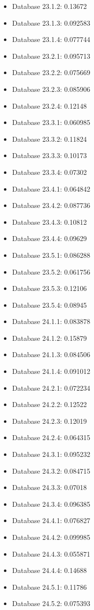 \begin{itemize}
\item Database 23.1.2: 0.13672
\item Database 23.1.3: 0.092583
\item Database 23.1.4: 0.077744
\item Database 23.2.1: 0.095713
\item Database 23.2.2: 0.075669
\item Database 23.2.3: 0.085906
\item Database 23.2.4: 0.12148
\item Database 23.3.1: 0.060985
\item Database 23.3.2: 0.11824
\item Database 23.3.3: 0.10173
\item Database 23.3.4: 0.07302
\item Database 23.4.1: 0.064842
\item Database 23.4.2: 0.087736
\item Database 23.4.3: 0.10812
\item Database 23.4.4: 0.09629
\item Database 23.5.1: 0.086288
\item Database 23.5.2: 0.061756
\item Database 23.5.3: 0.12106
\item Database 23.5.4: 0.08945
\item Database 24.1.1: 0.083878
\item Database 24.1.2: 0.15879
\item Database 24.1.3: 0.084506
\item Database 24.1.4: 0.091012
\item Database 24.2.1: 0.072234
\item Database 24.2.2: 0.12522
\item Database 24.2.3: 0.12019
\item Database 24.2.4: 0.064315
\item Database 24.3.1: 0.095232
\item Database 24.3.2: 0.084715
\item Database 24.3.3: 0.07018
\item Database 24.3.4: 0.096385
\item Database 24.4.1: 0.076827
\item Database 24.4.2: 0.099985
\item Database 24.4.3: 0.055871
\item Database 24.4.4: 0.14688
\item Database 24.5.1: 0.11786
\item Database 24.5.2: 0.075393

\end{itemize}
